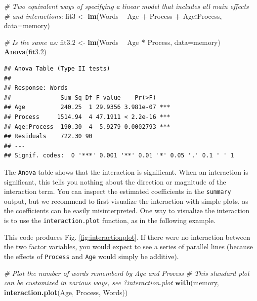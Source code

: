 \documentclass[]{book}
\newenvironment{Shaded}{\begin{snugshade}}{\end{snugshade}}
\newcommand{\CommentTok}[1]{\textcolor[rgb]{0.56,0.35,0.01}{\textit{#1}}}
\newcommand{\DataTypeTok}[1]{\textcolor[rgb]{0.13,0.29,0.53}{#1}}
\newcommand{\FloatTok}[1]{\textcolor[rgb]{0.00,0.00,0.81}{#1}}
\newcommand{\KeywordTok}[1]{\textcolor[rgb]{0.13,0.29,0.53}{\textbf{#1}}}
\newcommand{\NormalTok}[1]{#1}
\newcommand{\OperatorTok}[1]{\textcolor[rgb]{0.81,0.36,0.00}{\textbf{#1}}}
\newcommand{\StringTok}[1]{\textcolor[rgb]{0.31,0.60,0.02}{#1}}
\begin{document}
\begin{Shaded}
\begin{Highlighting}[]
\CommentTok{# Two equivalent ways of specifying a linear model that includes all main effects}
\CommentTok{# and interactions:}
\NormalTok{fit3 <-}\StringTok{ }\KeywordTok{lm}\NormalTok{(Words }\OperatorTok{~}\StringTok{ }\NormalTok{Age }\OperatorTok{+}\StringTok{ }\NormalTok{Process }\OperatorTok{+}\StringTok{ }\NormalTok{Age}\OperatorTok{:}\NormalTok{Process, }\DataTypeTok{data=}\NormalTok{memory)}

\CommentTok{# Is the same as:}
\NormalTok{fit3}\FloatTok{.2}\NormalTok{ <-}\StringTok{ }\KeywordTok{lm}\NormalTok{(Words }\OperatorTok{~}\StringTok{ }\NormalTok{Age }\OperatorTok{*}\StringTok{ }\NormalTok{Process, }\DataTypeTok{data=}\NormalTok{memory)}
\KeywordTok{Anova}\NormalTok{(fit3}\FloatTok{.2}\NormalTok{)}
\end{Highlighting}
\end{Shaded}

\begin{verbatim}
## Anova Table (Type II tests)
## 
## Response: Words
##              Sum Sq Df F value    Pr(>F)    
## Age          240.25  1 29.9356 3.981e-07 ***
## Process     1514.94  4 47.1911 < 2.2e-16 ***
## Age:Process  190.30  4  5.9279 0.0002793 ***
## Residuals    722.30 90                      
## ---
## Signif. codes:  0 '***' 0.001 '**' 0.01 '*' 0.05 '.' 0.1 ' ' 1
\end{verbatim}

The \texttt{Anova} table shows that the interaction is significant. When an interaction is significant, this tells you nothing about the direction or magnitude of the interaction term. You can inspect the estimated coefficients in the \texttt{summary} output, but we recommend to first visualize the interaction with simple plots, as the coefficients can be easily misinterpreted. One way to visualize the interaction is to use the \texttt{interaction.plot} function, as in the following example.

This code produces Fig. \ref{fig:interactionplot}. If there were no interaction between the two factor variables, you would expect to see a series of parallel lines (because the effects of \texttt{Process} and \texttt{Age} would simply be additive).

\begin{Shaded}
\begin{Highlighting}[]
\CommentTok{# Plot the number of words rememberd by Age and Process}
\CommentTok{# This standard plot can be customized in various ways, see ?interaction.plot}
\KeywordTok{with}\NormalTok{(memory, }\KeywordTok{interaction.plot}\NormalTok{(Age, Process, Words))}
\end{Highlighting}
\end{Shaded}
\end{document}
